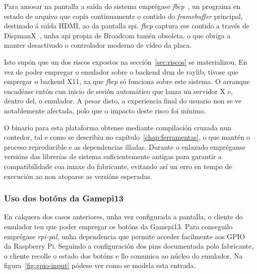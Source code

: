 Para amosar na pantalla a saída do sistema emprégase \textit{fbcp}~\cite{fbcp}, un programa en estado de arquivo
que copia continuamente o contido do \textit{framebuffer} principal, destinado á saída HDMI, ao da pantalla \acrshort{spi}.
\textit{fbcp} captura ese contido a través de DispmanX~\cite{dispmanx}, unha \acrshort{api} propia de Broadcom tamén obsoleta,
o que obriga a manter desactivado o controlador moderno de vídeo da placa.

Isto supón que un dos riscos expostos na sección~\ref{sec:riscos} se materializou.
En vez de poder empregar o emulador sobre o backend \acrshort{drm} de raylib, tívose que empregar o backend X11,
xa que \textit{fbcp} só funciona sobre este sistema. O arranque encadéase entón cun inicio de sesión automático
que lanza un servidor X e, dentro del, o emulador. A pesar disto, a experiencia final do usuario non se ve notablemente afectada,
polo que o impacto deste risco foi mínimo.

O binario para esta plataforma obtense mediante compilación cruzada nun contedor, tal e como se describiu no capítulo~\ref{chap:ferramentas},
o que mantén o proceso reproducible e as dependencias illadas.
Durante o enlazado empréganse versións das librerías de sistema suficientemente antigas para garantir a compatibilidade
coa imaxe do fabricante, evitando así un erro en tempo de execución ao non atoparse as versións esperadas.

\subsubsection{Uso dos botóns da Gamepi13}
En calquera dos casos anteriores, unha vez configurada a pantalla, o cliente do emulador ten que poder empregar os botóns da Gamepi13.
Para conseguilo emprégase \textit{rpi-pal}, unha dependencia que
permite acceder facilmente aos GPIO da Raspberry Pi. Seguindo a configuración dos pins documentada polo fabricante,
o cliente recolle o estado dos botóns e llo comunica ao núcleo do emulador.
Na figura~\ref{fig:gpio-input} pódese ver como se modela esta entrada.

